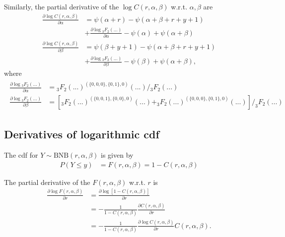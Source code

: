 \documentclass[11pt]{article}
\begin{document}
Similarly, the partial derivative of the $\log C(r,\alpha,\beta)$ w.r.t. $\alpha, \beta$ are
\begin{subequations}
\begin{align}
\frac{\partial \log C(r,\alpha,\beta)}{\partial \alpha} &= \psi(\alpha+r) - \psi(\alpha+\beta+r+y+1)  \\
&+ \frac{\partial \log {}_3F_2(...)}{\partial \alpha} - \psi(\alpha) + \psi(\alpha+\beta) \\
\frac{\partial \log C(r,\alpha,\beta)}{\partial \beta} &= \psi(\beta+y+1) - \psi(\alpha+\beta+r+y+1)  \\
&+ \frac{\partial \log {}_3F_2(...)}{\partial \beta} - \psi(\beta) + \psi(\alpha+\beta), 
\end{align}
\end{subequations}
where
\begin{subequations}
\begin{gather}
\begin{align}
\frac{\partial \log {}_3F_2(...)}{\partial \alpha} 
&=  {}_3F_2(...)^{(\{0,0,0\},\{0,1\},0)}(...)  / {}_3F_2(...) \\
\frac{\partial \log {}_3F_2(...)}{\partial \beta}
&= \left[ _3F_2(...)^{(\{0,0,1\},\{0,0\},0)}(...) + _3F_2(...)^{(\{0,0,0\},\{0,1\},0)}(...) \right]  / _3F_2(...)
\end{align}
\end{gather}
\end{subequations}




\subsection*{Derivatives of logarithmic cdf}
The cdf for $Y\sim \text{BNB}(r,\alpha,\beta)$ is given by
\begin{equation}
\begin{aligned}
 P(Y\leq y) &= F(r,\alpha,\beta) = 1 - C(r,\alpha,\beta)
\end{aligned}
\end{equation}

The partial derivative of the $F(r,\alpha,\beta)$ w.r.t. $r$ is
\begin{equation}
\begin{aligned}
	\frac{\partial \log F(r,\alpha,\beta)}{\partial r} &= \frac{\partial \log [1 - C(r,\alpha,\beta)]}{\partial r}\\
	 &= - \frac{1}{1 - C(r,\alpha,\beta)} \frac{\partial C(r,\alpha,\beta)}{\partial r} \\
	 &= - \frac{1}{1 - C(r,\alpha,\beta)} \frac{\partial \log C(r,\alpha,\beta)}{\partial r} C(r,\alpha,\beta).
\end{aligned}
\end{equation}
\end{document}

